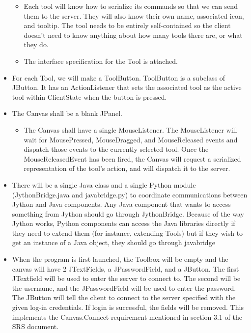 \documentclass[12pt]{article}
\begin{document}
\begin{itemize}
\begin{itemize}
  \item
  Each tool will know how to serialize its commands so that we can send them to
  the server. They will also know their own name, associated icon, and tooltip.
  The tool needs to be entirely self-contained so the client doesn't need to
  know anything about how many tools there are, or what they do.   \item
  The interface specification for the Tool is attached.
  \end{itemize}
  \item
  For each Tool, we will make a ToolButton. ToolButton is a subclass of JButton. It has an ActionListener that sets the associated tool as the active tool within ClientState when the button is pressed.
  \item
  The Canvas shall be a blank JPanel.
  \begin{itemize}
      \item
      The Canvas shall have a single MouseListener. The MouseListener will wait for MousePressed, MouseDragged, and MouseReleased events and dispatch those events to the currently selected tool. Once the MouseReleasedEvent has been fired, the Canvas will request a serialized representation of the tool's action, and will dispatch it to the server.
  \end{itemize}
  \item
      There will be a single Java class and a single Python module (JythonBridge.java and javabridge.py) to coordinate communications between Jython and Java components. Any Java component that wants to access something from Jython should go through JythonBridge. Because of the way Jython works, Python components can access the Java libraries directly if they need to extend them (for instance, extending Tools) but if they wish to get an instance of a Java object, they should go through javabridge
  \item
     When the program is first launched, the Toolbox will be empty and the
     canvas will have 2 JTextFields, a JPasswordField, and a JButton. The first
     JTextfield will be used to enter the server to connect to. The second will
     be the username, and the JPasswordField will be used to enter the
     password. The JButton will tell the client to connect to the server
     specified with the given log-in credentials. If login is successful, the
     fields will be removed. This implements the Canvas.Connect requirement
     mentioned in section 3.1 of the SRS document.
\end{itemize}
\end{document}
